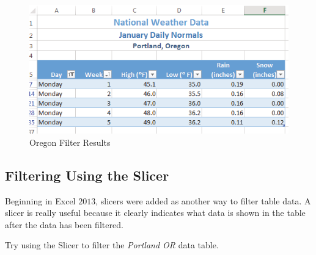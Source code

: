 \begin{figure}[H]
	\centering
	\includegraphics[width=\maxwidth{.95\linewidth}]{gfx/ch05_fig19}
	\caption{Oregon Filter Results}
	\label{05:fig19}
\end{figure}

\subsection{Filtering Using the Slicer}

Beginning in Excel $ 2013 $, slicers were added as another way to filter table data. A slicer is really useful because it clearly indicates what data is shown in the table after the data has been filtered.

Try using the Slicer to filter the \textit{Portland OR} data table.

